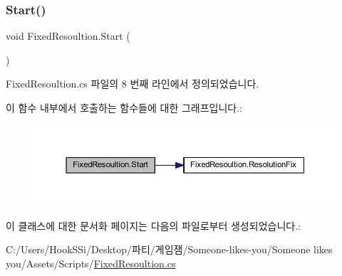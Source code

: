 \subsubsection{\texorpdfstring{Start()}{Start()}}
{\footnotesize\ttfamily void Fixed\+Resoultion.\+Start (\begin{DoxyParamCaption}{ }\end{DoxyParamCaption})\hspace{0.3cm}{\ttfamily [private]}}



Fixed\+Resoultion.\+cs 파일의 8 번째 라인에서 정의되었습니다.


\begin{DoxyCode}{0}

\end{DoxyCode}
이 함수 내부에서 호출하는 함수들에 대한 그래프입니다.\+:\nopagebreak
\begin{figure}[H]
\begin{center}
\leavevmode
\includegraphics[width=350pt]{d3/d6d/class_fixed_resoultion_aa0b35345a2890692b24ae1e690d59437_cgraph}
\end{center}
\end{figure}


이 클래스에 대한 문서화 페이지는 다음의 파일로부터 생성되었습니다.\+:\begin{DoxyCompactItemize}
\item 
C\+:/\+Users/\+Hook\+S\+Si/\+Desktop/파티/게임잼/\+Someone-\/likes-\/you/\+Someone likes you/\+Assets/\+Scripts/\mbox{\hyperlink{_fixed_resoultion_8cs}{Fixed\+Resoultion.\+cs}}\end{DoxyCompactItemize}

